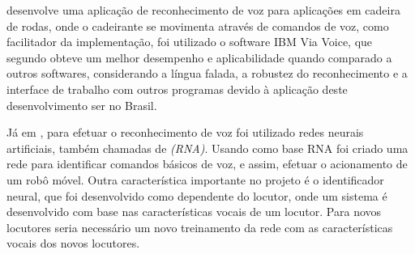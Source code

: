  desenvolve uma aplicação de reconhecimento de voz para aplicações em cadeira de rodas, onde o cadeirante se movimenta através de comandos de voz, como facilitador da implementação, foi utilizado o software IBM Via Voice, que segundo  obteve um melhor desempenho e aplicabilidade quando comparado a outros softwares, considerando a língua falada, a robustez do reconhecimento e a interface de trabalho com outros programas devido à aplicação deste desenvolvimento ser no Brasil.

Já em , para efetuar o reconhecimento de voz foi utilizado redes neurais artificiais, também chamadas de \textit{(RNA)}. Usando como base RNA foi criado uma rede para identificar comandos básicos de voz, e assim, efetuar o acionamento de um robô móvel. Outra característica importante no projeto é o identificador neural, que foi desenvolvido como dependente do locutor, onde um sistema é desenvolvido com base nas características vocais de um locutor. Para novos locutores seria necessário um novo treinamento da rede com as características vocais dos novos locutores.





